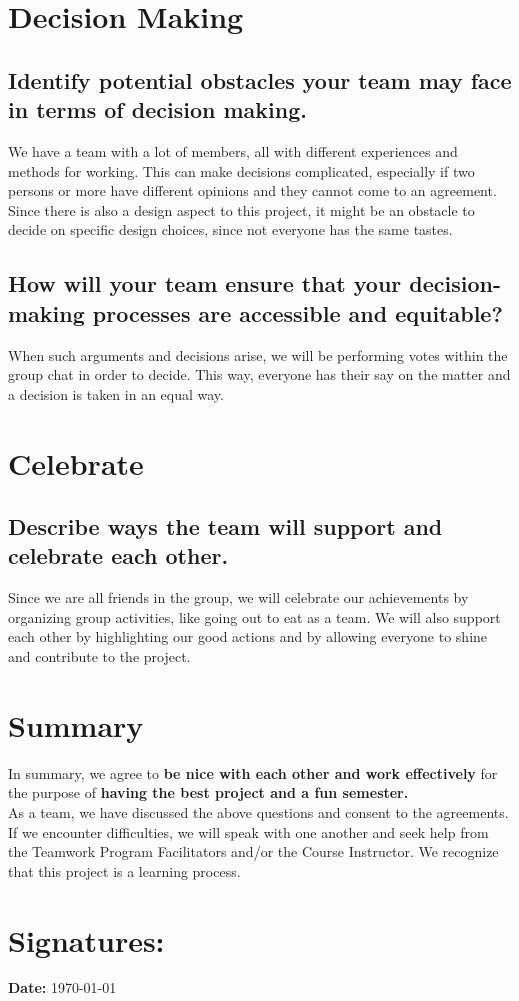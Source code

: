 \documentclass[11pt]{article}
\begin{document}
\section*{Decision Making}
\subsection*{Identify potential obstacles your team may face in terms of decision making.}
We have a team with a lot of members, all with different experiences and methods for working. This can make decisions complicated, especially if two persons or more have different opinions and they cannot come to an agreement. Since there is also a design aspect to this project, it might be an obstacle to decide on specific design choices, since not everyone has the same tastes.
\subsection*{How will your team ensure that your decision-making processes are accessible and equitable?}
When such arguments and decisions arise, we will be performing votes within the group chat in order to decide. This way, everyone has their say on the matter and a decision is taken in an equal way. 

\section*{Celebrate}
\subsection*{Describe ways the team will support and celebrate each other.}
Since we are all friends in the group, we will celebrate our achievements by organizing group activities, like going out to eat as a team. We will also support each other by highlighting our good actions and by allowing everyone to shine and contribute to the project.

\section*{Summary}
In summary, we agree to \textbf{be nice with each other and work effectively} for the purpose of \textbf{having the best project and a fun semester.} \\

As a team, we have discussed the above questions and consent to the agreements. If we encounter difficulties, we will speak with one another and seek help from the Teamwork Program Facilitators and/or the Course Instructor. We recognize that this project is a learning process.

\section*{Signatures:}
\vspace{2in}

\textbf{Date:} \today
\end{document}

